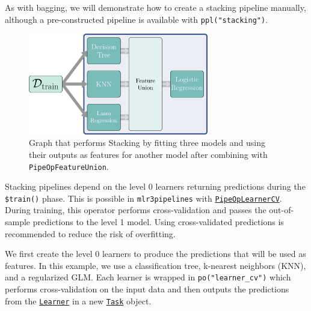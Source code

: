 As with bagging, we will demonstrate how to create a stacking pipeline
manually, although a pre-constructed pipeline is available with
\texttt{ppl("stacking")}.

\begin{figure}

{\centering \includegraphics[width=0.7\textwidth,height=\textheight]{chapters/chapter8/Figures/mlr3book_figures-27.png}

}

\caption{\label{fig-pipelines-stacking}Graph that performs Stacking by
fitting three models and using their outputs as features for another
model after combining with \texttt{PipeOpFeatureUnion}.}

\end{figure}

Stacking pipelines depend on the level 0 learners returning predictions
during the \texttt{\$train()} phase. This is possible in
\texttt{mlr3pipelines} with
\href{https://mlr3pipelines.mlr-org.com/reference/mlr_pipeops_learner_cv.html}{\texttt{PipeOpLearnerCV}}.
During training, this operator performs cross-validation and passes the
out-of-sample predictions to the level 1 model. Using cross-validated
predictions is recommended to reduce the risk of overfitting.

We first create the level 0 learners to produce the predictions that
will be used as features. In this example, we use a classification
tree, k-nearest
neighbors
(KNN), and a regularized
GLM. Each learner is wrapped in
\texttt{po("learner\_cv")} which performs cross-validation on the input
data and then outputs the predictions from the
\href{https://mlr3.mlr-org.com/reference/Learner.html}{\texttt{Learner}}
in a new
\href{https://mlr3.mlr-org.com/reference/Task.html}{\texttt{Task}}
object.

